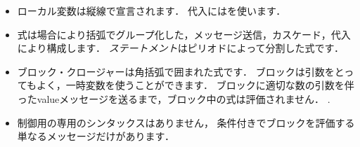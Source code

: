 \documentclass[a4paper,10pt,twoside]{book}
\begin{document}
\begin{itemize}
\item		ローカル変数は縦線で宣言されます．
		代入には\ct{:=}を使います．

\item		式は場合により括弧でグループ化した，メッセージ送信，カスケード，代入により構成します．
		\emph{ステートメント}はピリオドによって分割した式です．

\item		ブロック・クロージャーは角括弧で囲まれた式です．
		ブロックは引数をとってもよく，一時変数を使うことができます．
		ブロックに適切な数の引数を伴ったvalueメッセージを送るまで，ブロック中の式は評価されません．
		.

\item		制御用の専用のシンタックスはありません，
		条件付きでブロックを評価する単なるメッセージだけがあります．

\end{itemize}

\ifx\wholebook\relax\else
\end{document}
